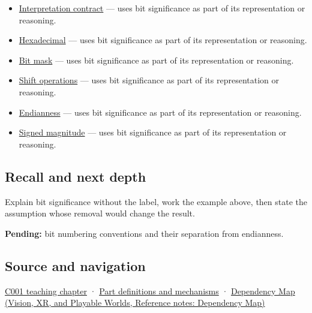 \begin{itemize}
\tightlist
\item
  \hyperref[appendix-f414bd4ed05c]{Interpretation contract} --- uses bit significance as part of its representation or reasoning.
\item
  \hyperref[appendix-6b8075763724]{Hexadecimal} --- uses bit significance as part of its representation or reasoning.
\item
  \hyperref[appendix-dbe5905163c2]{Bit mask} --- uses bit significance as part of its representation or reasoning.
\item
  \hyperref[appendix-73425b25118e]{Shift operations} --- uses bit significance as part of its representation or reasoning.
\item
  \hyperref[appendix-bc07c3d25b18]{Endianness} --- uses bit significance as part of its representation or reasoning.
\item
  \hyperref[appendix-ce20506c8532]{Signed magnitude} --- uses bit significance as part of its representation or reasoning.
\end{itemize}

\subsection{Recall and next depth}\label{appendix-280445746493-recall-and-next-depth}

Explain bit significance without the label, work the example above, then state the assumption whose removal would change the result.

\textbf{Pending:} bit numbering conventions and their separation from endianness.

\subsection{Source and navigation}\label{appendix-280445746493-source-and-navigation}

\hyperref[01-foundations-i-ch001-from-a-signal-to-an-interpretation]{C001 teaching chapter} · \hyperref[appendix-fd090d982a15]{Part definitions and mechanisms} · \href{../07-Vision-XR-and-Playable-Worlds/main.pdf\#nameddest=appendix-4ad47bdd269a}{Dependency Map (Vision, XR, and Playable Worlds, Reference notes: Dependency Map)}

